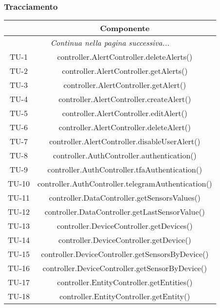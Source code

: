 	\subsubsection{Tracciamento}
		\begin{center}
			\begin{longtable}{|c|c|}
			\hline
			\rowcolor{lighter-grayer}{ \textbf{Codice} } & {\textbf{Componente} } \\ \hline
			\endhead
			\multicolumn{2}{|c|}{\textit{Continua nella pagina successiva...}}\\
			\hline
			\hline
			\endfoot
			\endlastfoot

			\hline
			TU-1 & controller.AlertController.deleteAlerts() \\
			\hline
			TU-2 & controller.AlertController.getAlerts() \\
			\hline
			TU-3 & controller.AlertController.getAlert() \\
			\hline
			TU-4 & controller.AlertController.createAlert() \\
			\hline
			TU-5 & controller.AlertController.editAlert() \\
			\hline
			TU-6 & controller.AlertController.deleteAlert() \\
			\hline
			TU-7 & controller.AlertController.disableUserAlert() \\
			\hline
			TU-8 & controller.AuthController.authentication() \\
			\hline
			TU-9 & controller.AuthController.tfaAuthentication() \\
			\hline
			TU-10 & controller.AuthController.telegramAuthentication() \\
			\hline
			TU-11 & controller.DataController.getSensorsValues() \\
			\hline
			TU-12 & controller.DataController.getLastSensorValue() \\
			\hline
			TU-13 & controller.DeviceController.getDevices() \\
			\hline
			TU-14 & controller.DeviceController.getDevice() \\
			\hline
			TU-15 & controller.DeviceController.getSensorsByDevice() \\
			\hline
			TU-16 & controller.DeviceController.getSensorByDevice() \\
			\hline
			TU-17 & controller.EntityController.getEntities() \\
			\hline
			TU-18 & controller.EntityController.getEntity() \\

\end{longtable}
\end{center}
